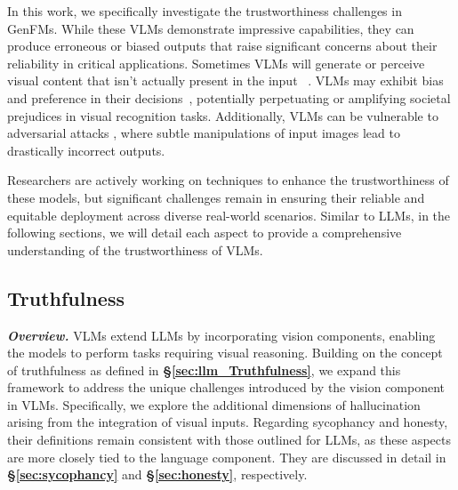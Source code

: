 In this work, we specifically investigate the trustworthiness challenges in GenFMs. While these VLMs demonstrate impressive capabilities, they can produce erroneous or biased outputs that raise significant concerns about their reliability in critical applications.
Sometimes VLMs will generate or perceive visual content that isn't actually present in the input ~\cite{cui2023holistic, Zhang2023SirensSI, Li2023EvaluatingOH}.
VLMs may exhibit bias and preference in their decisions~\cite{xiao2024genderbias, zhou2022vlstereoset,janghorbani2023multimodal}, potentially perpetuating or amplifying societal prejudices in visual recognition tasks.  
Additionally, VLMs can be vulnerable to adversarial attacks \cite{qi2023visual,shayegani2023jailbreak,carlini2024aligned}, where subtle manipulations of input images lead to drastically incorrect outputs. 

Researchers are actively working on techniques to enhance the trustworthiness of these models, but significant challenges remain in ensuring their reliable and equitable deployment across diverse real-world scenarios. Similar to LLMs, in the following sections, we will detail each aspect to provide a comprehensive understanding of the trustworthiness of VLMs. 

\subsection{Truthfulness}

\textbf{\textit{Overview.}} VLMs extend LLMs by incorporating vision components, enabling the models to perform tasks requiring visual reasoning.
Building on the concept of truthfulness as defined in \textbf{\S\ref{sec:llm_Truthfulness}}, we expand this framework to address the unique challenges introduced by the vision component in VLMs. Specifically, we explore the additional dimensions of hallucination arising from the integration of visual inputs. Regarding sycophancy and honesty, their definitions remain consistent with those outlined for LLMs, as these aspects are more closely tied to the language component. They are discussed in detail in \textbf{\S\ref{sec:sycophancy}} and \textbf{\S\ref{sec:honesty}}, respectively.


